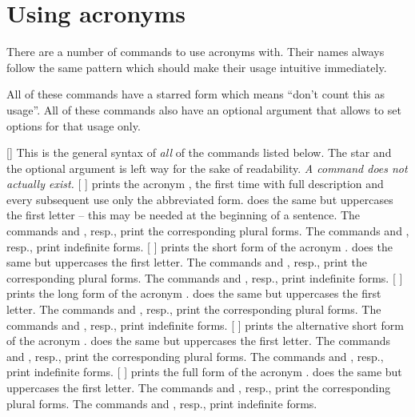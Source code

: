 \documentclass{acro-manual}
\begin{document}
\section{Using acronyms}\label{sec:using-acronyms}
There are a number of commands to use acronyms with. Their names always follow
the same pattern which should make their usage intuitive immediately.

All of these commands have a starred form which means \enquote{don't count
  this as usage}. All of these commands also have an optional argument that
allows to set options for that usage only.
\begin{commands}
  [\sarg{}]
    This is the general syntax of \emph{all} of the commands listed below.
    The star and the optional argument is left way for the sake of
    readability. \emph{A command  does not actually exist.}
  [\quad{}\quad{}\quad
    \quad{}\quad{}]
     prints the acronym , the first time with full description
    and every subsequent use only the abbreviated form.  does the same
    but uppercases the first letter -- this may be needed at the beginning of
    a sentence.  The commands  and , resp., print the
    corresponding plural forms.  The commands  and , resp.,
    print indefinite forms.
  [\quad{}\quad{}\quad
    \quad{}\quad{}]
     prints the short form of the acronym .  does the
    same but uppercases the first letter. The commands  and
    , resp., print the corresponding plural forms. The commands
     and , resp., print indefinite forms.
  [\quad{}\quad{}\quad
    \quad{}\quad{}]
     prints the long form of the acronym .  does the
    same but uppercases the first letter. The commands  and
    , resp., print the corresponding plural forms. The commands
     and , resp., print indefinite forms.
  [\quad{}\quad{}\quad
    \quad{}\quad{}]
     prints the alternative short form of the acronym .
     does the same but uppercases the first letter. The commands
     and , resp., print the corresponding plural forms. The
    commands  and , resp., print indefinite forms.
  [\quad{}\quad{}\quad
    \quad{}\quad{}]
     prints the full form of the acronym .  does the
    same but uppercases the first letter. The commands  and
    , resp., print the corresponding plural forms. The commands
     and , resp., print indefinite forms.
\end{commands}
\end{document}
